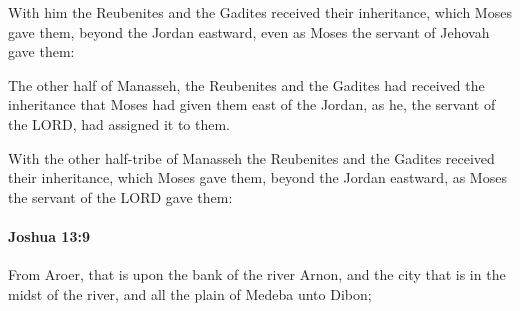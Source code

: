 			\begin{versebox}
					\item[BHS] 
					\item[ASV] With him the Reubenites and the Gadites received their inheritance, which Moses gave them, beyond the Jordan eastward, even as Moses the servant of Jehovah gave them:
					\item[NIV] The other half of Manasseh, the Reubenites and the Gadites had received the inheritance that Moses had given them east of the Jordan, as he, the servant of the LORD, had assigned it to them.
					\item[NRSV] With the other half-tribe of Manasseh the Reubenites and the Gadites received their inheritance, which Moses gave them, beyond the Jordan eastward, as Moses the servant of the LORD gave them:
			\end{versebox}

		\paragraph{Joshua 13:9} %
			\label{JOSHUA-13-9}

			From Aroer, that is upon the bank of the river Arnon, and the city that is in the midst of the river, and all the plain of Medeba unto Dibon;

